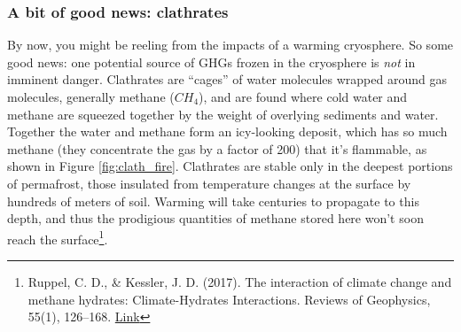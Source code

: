 \documentclass[amstex,12pt]{book}
\begin{document}

\subsubsection{A bit of good news: clathrates} By now, you might be reeling from the impacts of a warming cryosphere. So some good news: one potential source of GHGs frozen in the cryosphere is \emph{not} in imminent danger. Clathrates are ``cages'' of water molecules wrapped around gas molecules, generally methane ($CH_4$), and are found where cold water and methane are squeezed together by the weight of overlying sediments and water. Together the water and methane form an icy-looking deposit, which has so much methane (they concentrate the gas by a factor of 200) that it's flammable, as shown in Figure \ref{fig:clath_fire}. Clathrates are stable only in the deepest portions of permafrost, those insulated from temperature changes at the surface by hundreds of meters of soil. Warming will take centuries to propagate to this depth, and thus the prodigious quantities of methane stored here won't soon reach the surface\footnote{Ruppel, C. D., \& Kessler, J. D. (2017). The interaction of climate change and methane hydrates: Climate-Hydrates Interactions. Reviews of Geophysics, 55(1), 126–168. \href{https://doi.org/10.1002/2016RG000534}{Link}}.   
\end{document}
